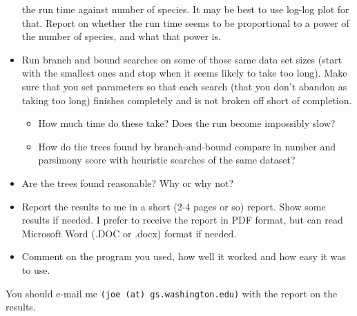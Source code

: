 \documentclass[12pt]{article}
\begin{document}
\begin{itemize}
the run time against number of species.  It may be best to use log-log plot
for that.  Report on whether the run time seems to be proportional to a
power of the number of species, and what that power is.
\item Run branch and bound searches on some of those same data set sizes
(start with the smallest ones and stop when it seems likely to take too long).  Make sure
that you set parameters so that each search (that you don't abandon as
taking too long) finishes completely and is
not broken off short of completion.
\begin{itemize}
\item  How much
time do these take?  Does the run become impossibly slow?  
\item  How do the trees
found by branch-and-bound compare in number and parsimony score with heuristic searches of the
same dataset?
\end{itemize}
\item Are the trees found reasonable?  Why or why not?
\item Report the results to me in a short (2-4 pages or so) report.  Show some
results if needed.  I prefer to receive the report in PDF format, but can
read Microsoft Word (.DOC or .docx) format if needed.
\item Comment on the program you used, how well it worked and how easy it
was to use.
\end{itemize}
\bigskip

You should e-mail me {\tt (joe (at) gs.washington.edu)} with the report on the results.

\vfill

\vfill
\end{document}
